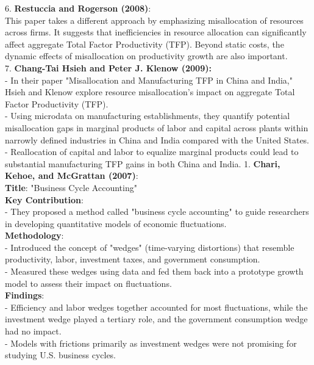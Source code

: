 \documentclass[12pt]{extarticle}
\begin{document}
6. \textbf{Restuccia and Rogerson (2008)}:\\
This paper takes a different approach by emphasizing misallocation of resources across firms. It suggests that inefficiencies in resource allocation can significantly affect aggregate Total Factor Productivity (TFP).
Beyond static costs, the dynamic effects of misallocation on productivity growth are also important.\\


7. \textbf{Chang-Tai Hsieh and Peter J. Klenow (2009):}\\
      - In their paper "Misallocation and Manufacturing TFP in China and India," Hsieh and Klenow explore resource misallocation's impact on aggregate Total Factor Productivity (TFP).\\
      - Using microdata on manufacturing establishments, they quantify potential misallocation gaps in marginal products of labor and capital across plants within narrowly defined industries in China and India compared with the United States.\\
      - Reallocation of capital and labor to equalize marginal products could lead to substantial manufacturing TFP gains in both China and India.
\newpage
1. \textbf{Chari, Kehoe, and McGrattan (2007)}:\\   
\textbf{Title}: "Business Cycle Accounting"\\
\textbf{Key Contribution}:\\
       - They proposed a method called "business cycle accounting" to guide researchers in developing quantitative models of economic fluctuations.\\
\textbf{Methodology}:\\
       - Introduced the concept of "wedges" (time-varying distortions) that resemble productivity, labor, investment taxes, and government consumption.\\
       - Measured these wedges using data and fed them back into a prototype growth model to assess their impact on fluctuations.\\
\textbf{Findings}:\\
       - Efficiency and labor wedges together accounted for most fluctuations, while the investment wedge played a tertiary role, and the government consumption wedge had no impact.\\
       - Models with frictions primarily as investment wedges were not promising for studying U.S. business cycles.\\\\\\
\end{document}
